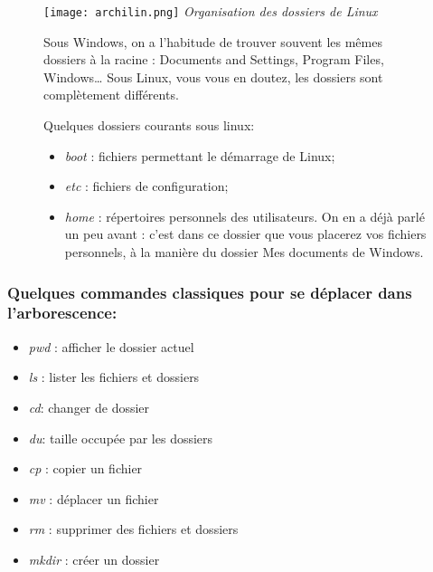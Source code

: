 \begin{figure}[h]
\begin{minipage}[c]{.49\linewidth}
\begin{center}
\texttt{[image: archilin.png]}
\textit{Organisation des dossiers de Linux}
\end{center}
\end{minipage} \hfill
\begin{minipage}[c]{.49\linewidth}

Sous Windows, on a l'habitude de trouver souvent les mêmes dossiers à la racine : Documents and Settings, Program Files, Windows… Sous Linux, vous vous en doutez, les dossiers sont complètement différents. 
\newline\newline

Quelques dossiers courants sous linux:
\begin{itemize}
\item \textit{boot} : fichiers permettant le démarrage de Linux;
\item \textit{etc} : fichiers de configuration;
\item \textit{home} : répertoires personnels des utilisateurs. On en a déjà parlé un peu avant : c'est dans ce dossier que vous placerez vos fichiers personnels, à la manière du dossier Mes documents de Windows.
\end{itemize}
\end{minipage}
\end{figure}


\subsubsection{Quelques commandes classiques pour se déplacer dans l'arborescence:}

\begin{itemize}
\item \textit{pwd} : afficher le dossier actuel
\item \textit{ls} : lister les fichiers et dossiers
\item \textit{cd}: changer de dossier
\item \textit{du}: taille occupée par les dossiers
\item \textit{cp} : copier un fichier
\item \textit{mv} : déplacer un fichier
\item \textit{rm} : supprimer des fichiers et dossiers
\item \textit{mkdir} : créer un dossier
\end{itemize}


